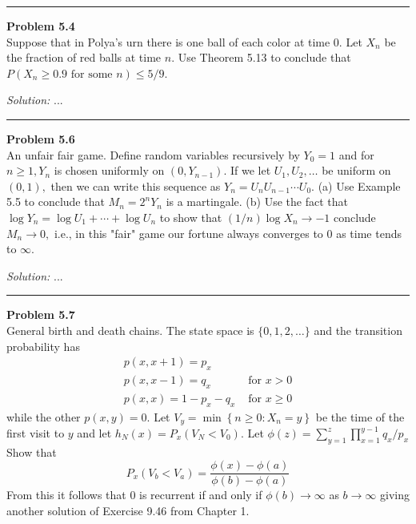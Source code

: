 \documentclass[a4paper, 11pt]{article}
\newenvironment{problem}[2][Problem]
    { \begin{mdframed}[backgroundcolor=gray!20] \textbf{#1 #2} \\}
    {  \end{mdframed}}
\newenvironment{solution}
    {\textit{Solution:}}
    {}
\begin{document}
%
\noindent\rule{7in}{2.8pt}
\begin{problem}{5.4}
Suppose that in Polya's urn there is one ball of each color at time 0. Let $X_{n}$ be the fraction of red balls at time $n .$ Use Theorem 5.13 to conclude that $P\left(X_{n} \geq 0.9 \text { for some } n\right) \leq 5 / 9$.
\end{problem}
\begin{solution}
...
\end{solution} 

%
\noindent\rule{7in}{2.8pt}
\begin{problem}{5.6}
An unfair fair game. Define random variables recursively by $Y_{0}=1$ and
for $n \geq 1, Y_{n}$ is chosen uniformly on $\left(0, Y_{n-1}\right) .$ If we let $U_{1}, U_{2}, \ldots$ be uniform on $(0,1),$ then we can write this sequence as $Y_{n}=U_{n} U_{n-1} \cdots U_{0} .$ (a) Use Example 5.5 to conclude that $M_{n}=2^{n} Y_{n}$ is a martingale. (b) Use the fact that $\log Y_{n}=\log U_{1}+\cdots+\log U_{n}$ to show that $(1 / n) \log X_{n} \rightarrow-1$
conclude $M_{n} \rightarrow 0,$ i.e., in this "fair" game our fortune always converges to 0 as time tends to $\infty$.
\end{problem}
\begin{solution}
...
\end{solution} 

%
\noindent\rule{7in}{2.8pt}
\begin{problem}{5.7}
General birth and death chains. The state space is $\{0,1,2, \ldots\}$ and the transition probability has
$$
\begin{array}{ll}
p(x, x+1)=p_{x} & \\
p(x, x-1)=q_{x} & \text { for } x>0 \\
p(x, x)=1-p_{x}-q_{x} & \text { for } x \geq 0
\end{array}
$$
while the other $p(x, y)=0 .$ Let $V_{y}=\min \left\{n \geq 0: X_{n}=y\right\}$ be the time of the first visit to $y$ and let $h_{N}(x)=P_{x}\left(V_{N}<V_{0}\right) .$ Let $\phi(z)=\sum_{y=1}^{z} \prod_{x=1}^{y-1} q_{x} / p_{x}$
Show that
$$
P_{x}\left(V_{b}<V_{a}\right)=\frac{\phi(x)-\phi(a)}{\phi(b)-\phi(a)}
$$
From this it follows that 0 is recurrent if and only if $\phi(b) \rightarrow \infty$ as $b \rightarrow \infty$ giving another solution of Exercise 9.46 from Chapter 1.
\end{problem}
\end{document}
